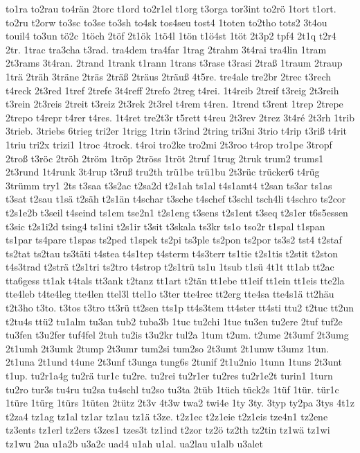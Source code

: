 {to1ra
to2rau
to4rän
2torc
t1ord
to2r1el
t1org
t3orga
tor3int
to2rö
1tort
t1ort.
to2ru
t2orw
to3sc
to3se
to3sh
to4sk
tos4seu
tost4
1toten
to2tho
tots2
3t4ou
touil4
to3un
tö2c
1töch
2töf
2t1ök
1tö4l
1tön
t1ö4st
1töt
2t3p2
tpf4
2t1q
t2r4
2tr.
1trac
tra3cha
t3rad.
tra4dem
tra4far
1trag
2trahm
3t4rai
tra4lin
1tram
2t3rams
3t4ran.
2trand
1trank
t1rann
1trans
t3rase
t3rasi
2traß
1traum
2traup
1trä
2träh
3träne
2träs
2träß
2träus
2träuß
4t5re.
tre4ale
tre2br
2trec
t3rech
t4reck
2t3red
1tref
2trefe
3t4reff
2trefo
2treg
t4rei.
1t4reib
2treif
t3reig
2t3reih
t3rein
2t3reis
2treit
t3reiz
2t3rek
2t3rel
t4rem
t4ren.
1trend
t3rent
1trep
2trepe
2trepo
t4repr
t4rer
t4res.
1t4ret
tre2t3r
t5rett
t4reu
2t3rev
2trez
3t4ré
2t3rh
1trib
3trieb.
3triebs
6trieg
tri2er
1trigg
1trin
t3rind
2tring
tri3ni
3trio
t4rip
t3riß
t4rit
1triu
tri2x
trizi1
1troc
4trock.
t4roi
tro2ke
tro2mi
2t3roo
t4rop
tro1pe
3tropf
2troß
t3röc
2tröh
2tröm
1tröp
2tröss
1tröt
2truf
1trug
2truk
trum2
trums1
2t3rund
1t4runk
3t4rup
t3ruß
tru2th
trü1be
trü1bu
2t3rüc
trücker6
t4rüg
3trümm
try1
2ts
t3saa
t3s2ac
t2sa2d
t2s1ah
ts1al
t4s1amt4
t2san
ts3ar
ts1as
t3sat
t2sau
t1sä
t2säh
t2s1än
t4schar
t3sche
t4schef
t3schl
tsch4li
t4schro
ts2cor
t2s1e2b
t3seil
t4seind
ts1em
tse2n1
t2s1eng
t3sens
t2s1ent
t3seq
t2s1er
t6s5essen
t3sic
t2s1i2d
tsing4
ts1ini
t2s1ir
t3sit
t3skala
ts3kr
ts1o
tso2r
t1spal
t1span
ts1par
ts4pare
t1spas
ts2ped
t1spek
ts2pi
ts3ple
ts2pon
ts2por
ts3s2
tst4
t2staf
ts2tat
ts2tau
ts3täti
t4stea
t4s1tep
t4sterm
t4s3terr
ts1tie
t2s1tis
t2stit
t2ston
t4s3trad
t2strä
t2s1tri
ts2tro
t4strop
t2s1trü
ts1u
1tsub
t1sü
4t1t
tt1ab
tt2ac
tta6gess
tt1ak
t4tals
tt3ank
t2tanz
tt1art
t2tän
tt1ebe
tt1eif
tt1ein
tt1eis
tte2la
tte4leb
t4te4leg
tte4len
ttel3l
ttel1o
t3ter
tte4rec
tt2erg
tte4sa
tte4s1ä
tt2häu
t2t3ho
t3to.
t3tos
t3tro
tt3rü
tt2sen
tts1p
tt4s3tem
tt4ster
tt4sti
ttu2
t2tuc
tt2un
t2tu4s
ttü2
tu1alm
tu3an
tub2
tuba3b
1tuc
tu2chi
1tue
tu3en
tu2ere
2tuf
tuf2e
tu3fen
t3u2fer
tuf4fel
2tuh
tu2is
t3u2kr
tul2a
1tum
t2um.
t2ume
2t3umf
2t3umg
2t1umh
2t3umk
2tump
2t3umr
tum2si
tum2so
2t3umt
2t1umw
t3umz
1tun.
2t1una
2t1und
t4une
2t3unf
t3unga
tung6s
2tunif
2t1u2nio
1tunn
1tuns
2t3unt
t1up.
tu2r1a4g
tu2rä
tur1c
tu2re.
tu2rei
tu2r1er
tu2res
tu2r1e2t
turin1
1turn
tu2ro
tur3s
tu4ru
tu2sa
tu4schl
tu2so
tu3ta
2tüb
1tüch
tück2s
1tüf
1tür.
tür1c
1türe
1türg
1türs
1tüten
2tütz
2t3v
4t3w
twa2
twi4e
1ty
3ty.
3typ
ty2pa
3tys
4t1z
t2za4
tz1ag
tz1al
tz1ar
tz1au
tz1ä
t3ze.
t2z1ec
t2z1eie
t2z1eis
tze4n1
tz2ene
tz3ents
tz1erl
tz2ers
t3zes1
tzes3t
tz1ind
t2zor
tz2ö
tz2th
tz2tin
tz1wä
tz1wi
tz1wu
2ua
u1a2b
u3a2c
uad4
u1ah
u1al.
ua2lau
u1alb
u3alet
}
